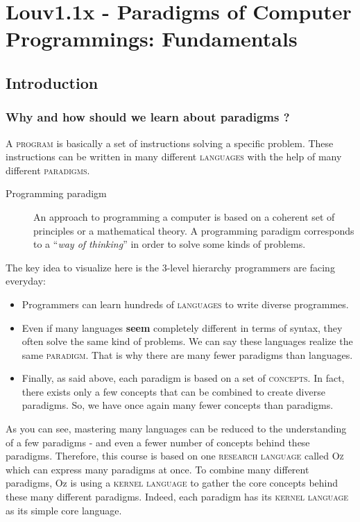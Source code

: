 \documentclass[11pt,a4paper,twoside,openright]{report}
\begin{document}
 
\chapter{Louv1.1x - Paradigms of Computer Programmings: Fundamentals}
\label{app:louv1x}
\section{Introduction}

\subsection{Why and how should we learn about paradigms ?}
A \textsc{program} is basically a set of instructions solving a specific 
problem. These instructions can be written in many different \textsc{languages} 
with the help of many different \textsc{paradigms}.

\begin{description}
 \item[Programming paradigm] An approach to programming a computer is based on a 
coherent set of principles or a mathematical theory. A programming paradigm 
corresponds to a \enquote{\textit{way of thinking}} in order to solve some 
kinds of problems.
\end{description}

The key idea to visualize here is the 3-level hierarchy programmers are facing 
everyday:
\begin{itemize}
  \item Programmers can learn hundreds of \textsc{languages} to write diverse 
programmes.
  \item Even if many languages \textbf{seem} completely different in terms of 
syntax, they often solve the same kind of problems. We can say these languages 
realize the same \textsc{paradigm}.  That is why there are many fewer paradigms 
than languages.
  \item Finally, as said above, each paradigm is based on a set of 
\textsc{concepts}. In fact, there exists only a few concepts that can be 
combined to create diverse paradigms. So, we have once again many fewer 
concepts than paradigms.
\end{itemize}

As you can see, mastering many languages can be reduced to the understanding of 
a few paradigms - and even a fewer number of concepts behind these paradigms. 
Therefore, this course is based on one \textsc{research language} called 
\textsc{Oz} which can express many paradigms at once. To combine many different 
paradigms, Oz is using a \textsc{kernel language} to gather the core concepts 
behind these many different paradigms. Indeed, each paradigm has its 
\textsc{kernel language} as its simple core language.
\end{document}
